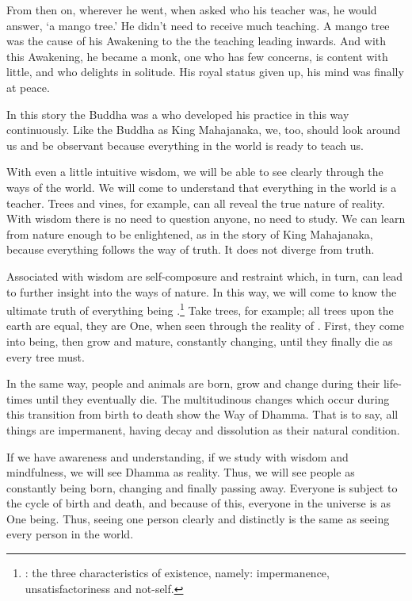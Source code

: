 From then on, wherever he went, when asked who his teacher was, he would answer, `a mango tree.' He didn't need to receive much teaching. A mango tree was the cause of his Awakening to the  the teaching leading inwards. And with this Awakening, he became a monk, one who has few concerns, is content with little, and who delights in solitude. His royal status given up, his mind was finally at peace.

In this story the Buddha was a  who developed his practice in this way continuously. Like the Buddha as King Mahajanaka, we, too, should look around us and be observant because everything in the world is ready to teach us.

With even a little intuitive wisdom, we will be able to see clearly through the ways of the world. We will come to understand that everything in the world is a teacher. Trees and vines, for example, can all reveal the true nature of reality. With wisdom there is no need to question anyone, no need to study. We can learn from nature enough to be enlightened, as in the story of King Mahajanaka, because everything follows the way of truth. It does not diverge from truth.

Associated with wisdom are self-composure and restraint which, in turn, can lead to further insight into the ways of nature. In this way, we will come to know the ultimate truth of everything being .\footnote{: the three characteristics of existence, namely: impermanence, unsatisfactoriness and not-self.} Take trees, for example; all trees upon the earth are equal, they are One, when seen through the reality of . First, they come into being, then grow and mature, constantly changing, until they finally die as every tree must.

In the same way, people and animals are born, grow and change during their life-times until they eventually die. The multitudinous changes which occur during this transition from birth to death show the Way of Dhamma. That is to say, all things are impermanent, having decay and dissolution as their natural condition.

If we have awareness and understanding, if we study with wisdom and mindfulness, we will see Dhamma as reality. Thus, we will see people as constantly being born, changing and finally passing away. Everyone is subject to the cycle of birth and death, and because of this, everyone in the universe is as One being. Thus, seeing one person clearly and distinctly is the same as seeing every person in the world.

